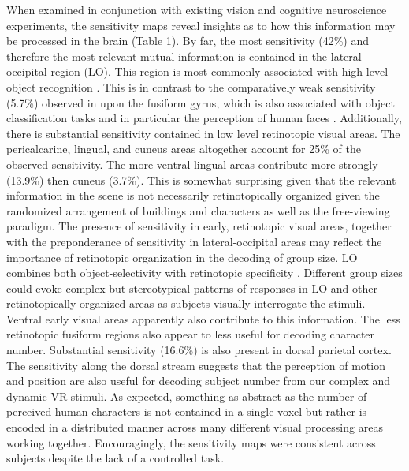 \documentclass{article}
\begin{document}
When examined in conjunction with existing vision and cognitive neuroscience experiments, the sensitivity maps reveal insights as to how this information may be processed in the brain (Table 1).
By far, the most sensitivity (42\%) and therefore the most relevant mutual information is contained in the lateral occipital region (LO).
This region is most commonly associated with high level object recognition \citep{Grill-Spector2001}.
This is in contrast to the comparatively weak sensitivity (5.7\%) observed in upon the fusiform gyrus, which is also associated with object classification tasks and in particular the perception of human faces \citep{Kanwisher1997}.
Additionally, there is substantial sensitivity contained in low level retinotopic visual areas. The pericalcarine, lingual, and cuneus areas altogether account for 25\% of the observed sensitivity. The more ventral lingual areas contribute more strongly (13.9\%) then cuneus (3.7\%).
This is somewhat surprising given that the relevant information in the scene is not necessarily retinotopically organized given the randomized arrangement of buildings and characters as well as the free-viewing paradigm.
The presence of sensitivity in early, retinotopic visual areas, together with the preponderance of sensitivity in lateral-occipital areas may reflect the importance of retinotopic organization in the decoding of group size. LO combines both object-selectivity with retinotopic specificity \citep{Sayres2008}. Different group sizes could evoke complex but stereotypical patterns of responses in LO and other retinotopically organized areas as subjects visually interrogate the stimuli. Ventral early visual areas apparently also contribute to this information. The less retinotopic fusiform regions \citep{Schwarzlose2008,Sayres2010} also appear to less useful for decoding character number.
Substantial sensitivity (16.6\%) is also present in dorsal parietal cortex. The sensitivity along the dorsal stream suggests that the perception of motion and position are also useful for decoding subject number from our complex and dynamic VR stimuli.
As expected, something as abstract as the number of perceived human characters is not contained in a single voxel but rather is encoded in a distributed manner across many different visual processing areas working together.
Encouragingly, the sensitivity maps were consistent across subjects despite the lack of a controlled task.
\end{document}
